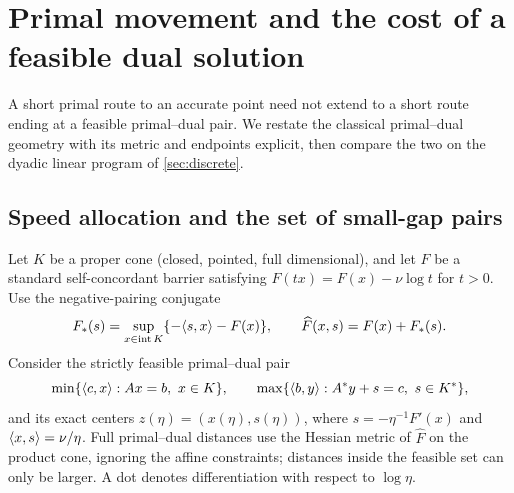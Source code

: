 \section{Primal movement and the cost of a feasible dual solution}
\label{sec:primal-dual}

A short primal route to an accurate point need not extend to a short
route ending at a feasible primal--dual pair. We restate the
classical primal--dual geometry with its metric and endpoints explicit,
then compare the two on the dyadic linear program of
\cref{sec:discrete}.

\subsection{Speed allocation and the set of small-gap pairs}
Let $K$ be a proper cone (closed, pointed, full dimensional), and let $F$
be a standard self-concordant barrier satisfying
$F(tx)=F(x)-\nu\log t$ for $t>0$. Use the negative-pairing conjugate
\[
 F_*(s)=\sup_{x\in\operatorname{int} K}\{-\langle s,x\rangle-F(x)\},
 \qquad \widehat F(x,s)=F(x)+F_*(s).
\]
Consider the strictly feasible primal--dual pair
\[
 \min\{\langle c,x\rangle:Ax=b,\ x\in K\},\qquad
 \max\{\langle b,y\rangle:A^*y+s=c,\ s\in K^*\},
\]
and its exact centers $z(\eta)=(x(\eta),s(\eta))$, where
$s=-\eta^{-1}F'(x)$ and $\langle x,s\rangle=\nu/\eta$.
Full primal--dual distances use the Hessian metric of $\widehat F$ on
the product cone, ignoring the affine constraints; distances
inside the feasible set can only be larger. A dot denotes
differentiation with respect to $\log\eta$.

